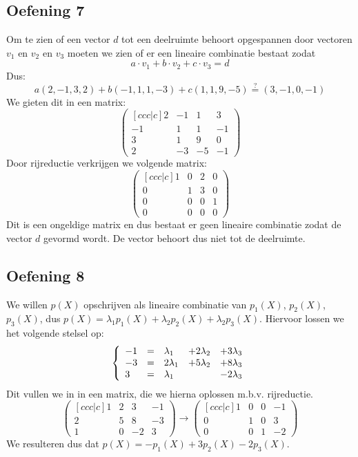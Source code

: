 \documentclass[lineaire_algebra_oplossingen.tex]{subfiles}
\begin{document}
\subsection{Oefening 7}
Om te zien of een vector $d$ tot een deelruimte behoort opgespannen door vectoren $v_1$ en $v_2$ en $v_3$ moeten we zien of er een lineaire combinatie bestaat zodat  $$a\cdot v_1 + b\cdot v_2 + c\cdot v_3 = d$$
Dus:
$$a(2,-1,3,2) + b(-1,1,1,-3) + c(1,1,9,-5) \overset{?}{=} (3,-1,0,-1)$$
We gieten dit in een matrix:
$$
\begin{pmatrix}[ccc|c]
2 & -1 & 1 &3\\
-1 & 1 & 1 & -1\\
3 & 1 &9 & 0\\
2 & -3 &-5& -1
\end{pmatrix}
$$
Door rijreductie verkrijgen we volgende matrix:
$$
\begin{pmatrix}[ccc|c]
1&0&2&0\\
0&1&3&0\\
0&0&0&1\\
0&0&0&0
\end{pmatrix}
$$
Dit is een ongeldige matrix en dus bestaat er geen lineaire combinatie zodat de vector $d$ gevormd wordt. De vector behoort dus niet tot de deelruimte.

\subsection{Oefening 8}
We willen $p(X)$ opschrijven als lineaire combinatie van $p_1(X)$, $p_2(X)$, $p_3(X)$, dus $p(X) = \lambda_1 p_1(X) + \lambda_2 p_2(X) + \lambda_2 p_3(X)$.
Hiervoor lossen we het volgende stelsel op:
\[
\left\{
\begin{array}{l l l l l}
  -1 &= &\lambda_1 &+ 2 \lambda_2 &+ 3 \lambda_3\\
  -3 &= &2 \lambda_1 &+ 5 \lambda_2 &+ 8 \lambda_3\\
  3 &= &\lambda_1 &&- 2 \lambda_3
\end{array}
\right.
\]
Dit vullen we in in een matrix, die we hierna oplossen m.b.v. rijreductie.
\[
\begin{pmatrix}[ccc|c]
  1 & 2 & 3 & -1\\
  2 & 5 & 8 & -3\\
  1 & 0 & -2 & 3
\end{pmatrix}
\longrightarrow
\begin{pmatrix}[ccc|c]
  1 & 0 & 0 & -1\\
  0 & 1 & 0 & 3\\
  0 & 0 & 1 & -2
\end{pmatrix}
\]
We resulteren dus dat $p(X) = - p_1(X) + 3 p_2(X) - 2 p_3(X)$.
\end{document}
